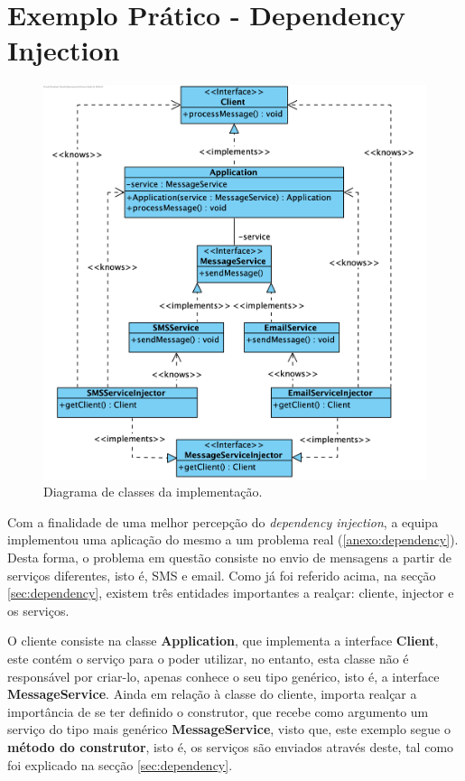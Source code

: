 \section{Exemplo Prático - Dependency Injection}
\label{sec:exemplo_di}

\begin{figure}[H]
    \centering
    \includegraphics[scale=0.65]{images/diagram_class_dependency.png}
    \caption{Diagrama de classes da implementação.}
    \label{fig:di-exemplo}
\end{figure}

\hspace{3mm} Com a finalidade de uma melhor percepção do \textit{dependency injection}, a equipa implementou uma aplicação do mesmo a um problema real (\ref{anexo:dependency}). Desta forma, o problema em questão consiste no envio de mensagens a partir de serviços diferentes, isto é, SMS e email. Como já foi referido acima, na secção \ref{sec:dependency}, existem três entidades importantes a realçar: cliente, injector e os serviços. 

O cliente consiste na classe \textbf{Application}, que implementa a interface \textbf{Client}, este contém o serviço para o poder utilizar, no entanto, esta classe não é responsável por criar-lo, apenas conhece o seu tipo genérico, isto é, a interface \textbf{MessageService}. Ainda em relação à classe do cliente, importa realçar a importância de se ter definido o construtor, que recebe como argumento um serviço do tipo mais genérico \textbf{MessageService}, visto que, este exemplo segue o \textbf{método do construtor}, isto é, os serviços são enviados através deste, tal como foi explicado na secção \ref{sec:dependency}. 

